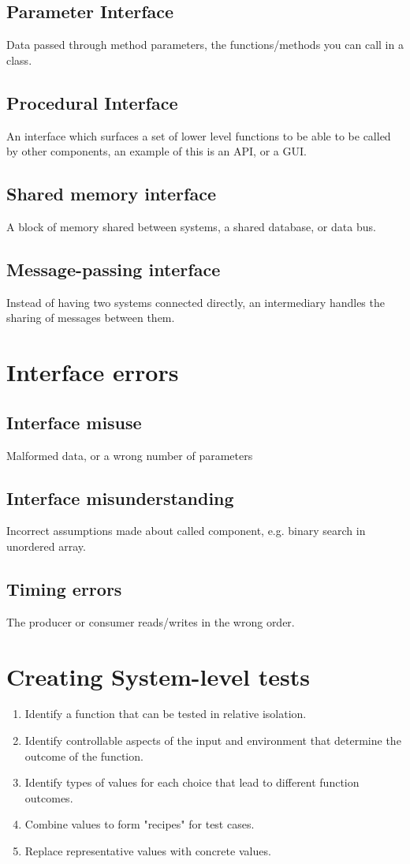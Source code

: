 \subsection{Parameter Interface}
Data passed through method parameters, the functions/methods you can call in a class.
\subsection{Procedural Interface}
An interface which surfaces a set of lower level functions to be able to be called by other components, an example of this is an API, or a GUI.
\subsection{Shared memory interface}
A block of memory shared between systems, a shared database, or data bus.
\subsection{Message-passing interface}
Instead of having two systems connected directly, an intermediary handles the sharing of messages between them.

\section{Interface errors}
\subsection{Interface misuse}
Malformed data, or a wrong number of parameters
\subsection{Interface misunderstanding}
Incorrect assumptions made about called component, e.g. binary search in unordered array.
\subsection{Timing errors}
The producer or consumer reads/writes in the wrong order.

\section{Creating System-level tests}

\begin{enumerate}
	\item Identify a function that can be tested in relative isolation.
	\item Identify controllable aspects of the input and environment that determine the outcome of the function.
	\item Identify types of values for each choice that lead to different function outcomes.
	\item Combine values to form "recipes" for test cases.
	\item Replace representative values with concrete values.
\end{enumerate}

